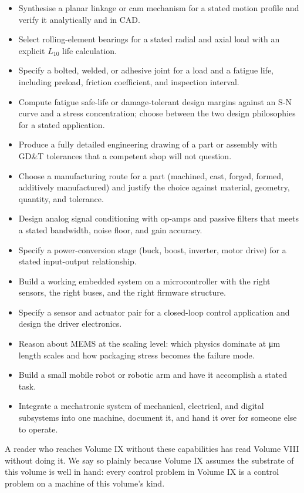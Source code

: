 \begin{itemize}[leftmargin=*]
  \item Synthesise a planar linkage or cam mechanism for a stated motion
    profile and verify it analytically and in CAD.
  \item Select rolling-element bearings for a stated radial and axial
    load with an explicit $L_{10}$ life calculation.
  \item Specify a bolted, welded, or adhesive joint for a load and a
    fatigue life, including preload, friction coefficient, and
    inspection interval.
  \item Compute fatigue safe-life or damage-tolerant design margins
    against an S-N curve and a stress concentration; choose between
    the two design philosophies for a stated application.
  \item Produce a fully detailed engineering drawing of a part or
    assembly with GD\&T tolerances that a competent shop will not
    question.
  \item Choose a manufacturing route for a part (machined, cast,
    forged, formed, additively manufactured) and justify the choice
    against material, geometry, quantity, and tolerance.
  \item Design analog signal conditioning with op-amps and passive
    filters that meets a stated bandwidth, noise floor, and gain
    accuracy.
  \item Specify a power-conversion stage (buck, boost, inverter,
    motor drive) for a stated input-output relationship.
  \item Build a working embedded system on a microcontroller with the
    right sensors, the right buses, and the right firmware structure.
  \item Specify a sensor and actuator pair for a closed-loop control
    application and design the driver electronics.
  \item Reason about MEMS at the scaling level: which physics dominate
    at \si{\micro\meter} length scales and how packaging stress
    becomes the failure mode.
  \item Build a small mobile robot or robotic arm and have it
    accomplish a stated task.
  \item Integrate a mechatronic system of mechanical, electrical, and
    digital subsystems into one machine, document it, and hand it
    over for someone else to operate.
\end{itemize}

A reader who reaches Volume IX without these capabilities has read Volume VIII without doing it. We say so plainly because Volume IX assumes the substrate of this volume is well in hand: every control problem in Volume IX is a control problem on a machine of this volume's kind.

